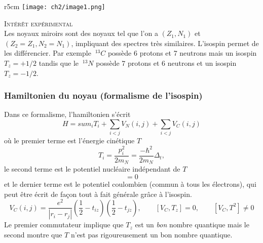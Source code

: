 	\begin{wrapfigure}[12]{r}{5cm}
	\vspace{-5mm}
	\texttt{[image: ch2/image1.png]}
	\end{wrapfigure}
	\textsc{Intérêt expérimental}\\
	Les noyaux miroirs sont des noyaux tel que l'on a $(Z_1,N_1)$ et $(Z_2=Z_1, N_2=N_1)$, impliquant 
	des spectres très similaires. L'isospin permet de les différencier. Par exemple $\ ^{13}C$ possède 6 protons 
	et 7 neutrons mais un isospin $T_z=+1/2$ tandis que le $\ ^{13}N$ possède 7 protons et 6 neutrons et 
	un isospin $T_z= -1/2$.\\
	
	\subsubsection{Hamiltonien du noyau (formalisme de l'isospin)}
	Dans ce formalisme, l'hamiltonien s'écrit
	\begin{equation}
	H = sum_i T_i + \sum_{i<j} V_N(i,j) + \sum_{i<j} V_C(i,j)
	\end{equation}
	où le premier terme est l'énergie cinétique $T$
	\begin{equation}
	T_i = \frac{p_i^2}{2m_N}=\frac{-\hbar^2}{2m_N}\Delta_t,
	\end{equation}
	le second terme est le potentiel nucléaire indépendant de $T$
	\begin{equation}
	[V_n,T]=0
	\end{equation}
	et le dernier terme est le potentiel coulombien (commun à tous les électrons), qui peut être écrit
	de façon tout à fait générale grâce à l'isospin.
	\begin{equation}
	V_C(i,j) = \frac{e^2}{|r_i-r_j|}\left(\frac{1}{2}-t_{iz}\right)\left(\frac{1}{2}-t_{jz}\right),\qquad
	[V_C,T_z]=0,\qquad [V_C, T^2]\neq 0
	\end{equation}		
	Le premier commutateur implique que $T_z$ est un \textit{bon} nombre quantique mais le second montre que
	$T$ n'est pas rigoureusement un bon nombre quantique. \\
	

